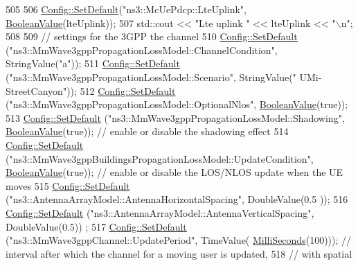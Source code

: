 \begin{DoxyCode}
{505 
506   \hyperlink{group__config_ga2e7882df849d8ba4aaad31c934c40c06}{Config::SetDefault}(\textcolor{stringliteral}{"ns3::McUePdcp::LteUplink"}, \hyperlink{classns3_1_1BooleanValue}{BooleanValue}(lteUplink));
507   std::cout << \textcolor{stringliteral}{"Lte uplink "} << lteUplink << \textcolor{stringliteral}{"\(\backslash\)n"};
508 
509   \textcolor{comment}{// settings for the 3GPP the channel}
510   \hyperlink{group__config_ga2e7882df849d8ba4aaad31c934c40c06}{Config::SetDefault} (\textcolor{stringliteral}{"ns3::MmWave3gppPropagationLossModel::ChannelCondition"}, 
      StringValue(\textcolor{stringliteral}{"a"}));
511   \hyperlink{group__config_ga2e7882df849d8ba4aaad31c934c40c06}{Config::SetDefault} (\textcolor{stringliteral}{"ns3::MmWave3gppPropagationLossModel::Scenario"}, StringValue(\textcolor{stringliteral}{"
      UMi-StreetCanyon"}));
512   \hyperlink{group__config_ga2e7882df849d8ba4aaad31c934c40c06}{Config::SetDefault} (\textcolor{stringliteral}{"ns3::MmWave3gppPropagationLossModel::OptionalNlos"}, 
      \hyperlink{classns3_1_1BooleanValue}{BooleanValue}(\textcolor{keyword}{true}));
513   \hyperlink{group__config_ga2e7882df849d8ba4aaad31c934c40c06}{Config::SetDefault} (\textcolor{stringliteral}{"ns3::MmWave3gppPropagationLossModel::Shadowing"}, 
      \hyperlink{classns3_1_1BooleanValue}{BooleanValue}(\textcolor{keyword}{true})); \textcolor{comment}{// enable or disable the shadowing effect}
514   \hyperlink{group__config_ga2e7882df849d8ba4aaad31c934c40c06}{Config::SetDefault} (\textcolor{stringliteral}{"ns3::MmWave3gppBuildingsPropagationLossModel::UpdateCondition"}, 
      \hyperlink{classns3_1_1BooleanValue}{BooleanValue}(\textcolor{keyword}{true})); \textcolor{comment}{// enable or disable the LOS/NLOS update when the UE moves}
515   \hyperlink{group__config_ga2e7882df849d8ba4aaad31c934c40c06}{Config::SetDefault} (\textcolor{stringliteral}{"ns3::AntennaArrayModel::AntennaHorizontalSpacing"}, DoubleValue(0.5
      ));
516   \hyperlink{group__config_ga2e7882df849d8ba4aaad31c934c40c06}{Config::SetDefault} (\textcolor{stringliteral}{"ns3::AntennaArrayModel::AntennaVerticalSpacing"}, DoubleValue(0.5))
      ;
517   \hyperlink{group__config_ga2e7882df849d8ba4aaad31c934c40c06}{Config::SetDefault} (\textcolor{stringliteral}{"ns3::MmWave3gppChannel::UpdatePeriod"}, TimeValue(
      \hyperlink{group__timecivil_gaf26127cf4571146b83a92ee18679c7a9}{MilliSeconds}(100))); \textcolor{comment}{// interval after which the channel for a moving user is updated, }
518                                                                                        \textcolor{comment}{// with spatial
}}
\end{DoxyCode}
